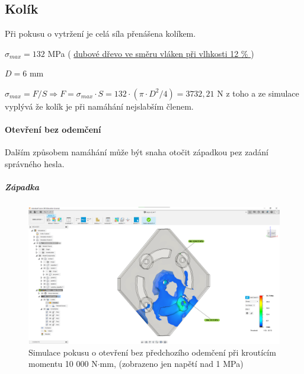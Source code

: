\newpage

\subsection{Kolík}
Při pokusu o vytržení je celá síla přenášena kolíkem.

\begin{table}[h]
    \centering
    \caption{Tabulka použitých symbolu pro napětí v kolíku v tahu}
    \label{tab:M3_symboly_kolik}
\end{table}

$ \sigma_{max} = 132  $ MPa    ( \href{https://is.mendelu.cz/eknihovna/opory/zobraz_cast.pl?fit_w=1;cast=9190}{dubové dřevo ve směru vláken při vlhkosti 12 \% }\parencite{pevnost_dreva}) %

$D = 6$ mm

 \(\sigma_{max} = F/S \Rightarrow F = \sigma_{max} \cdot S = 132 \cdot (\pi \cdot D^2/4) = 3 732,21 \) N  z toho a ze simulace vyplývá že kolík je při namáhání nejslabším členem.

\paragraph{Otevření bez odemčení}
Dalším způsobem namáhání může být snaha otočit západkou pez zadání správného hesla.

\subparagraph{Západka}

\begin{figure}[htbp]
    \centering
    \includegraphics[width=\textwidth]{kapitoly/obrazky/M3/simulace/odolnost_proti_nasilnemu_odemceni_10Nm.png}
    \caption{Simulace pokusu o otevření bez předchozího odemčení při kroutícím momentu 10 000 N$\cdot$mm, (zobrazeno jen napětí nad 1 MPa) \centering}
    \label{fig:M3-simulace-vytrzeni}
\end{figure}

